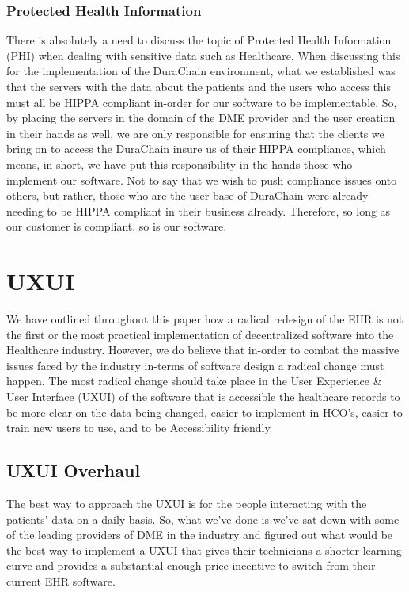 \documentclass[preprint,pre,floats,aps,amsmath,amssymb]{revtex4-1}
\begin{document}
\subsubsection{Protected Health Information}
There is absolutely a need to discuss the topic of Protected Health Information (PHI) when dealing with sensitive data such as Healthcare. When discussing this for the implementation of the DuraChain environment, what we established was that the servers with the data about the patients and the users who access this must all be HIPPA compliant in-order for our software to be implementable. So, by placing the servers in the domain of the DME provider and the user creation in their hands as well, we are only responsible for ensuring that the clients we bring on to access the DuraChain insure us of their HIPPA compliance, which means, in short, we have put this responsibility in the hands those who implement our software. Not to say that we wish to push compliance issues onto others, but rather, those who are the user base of DuraChain were already needing to be HIPPA compliant in their business already. Therefore, so long as our customer is compliant, so is our software.

\section{UXUI}
We have outlined throughout this paper how a radical redesign of the EHR is not the first or the most practical implementation of decentralized software into the Healthcare industry. However, we do believe that in-order to combat the massive issues faced by the industry in-terms of software design a radical change must happen. The most radical change should take place in the User Experience & User Interface (UXUI) of the software that is accessible the healthcare records to be more clear on the data being changed, easier to implement in HCO’s, easier to train new users to use, and to be Accessibility friendly.

\subsection{UXUI Overhaul}
The best way to approach the UXUI is for the people interacting with the patients' data on a daily basis. So, what we’ve done is we’ve sat down with some of the leading providers of DME in the industry and figured out what would be the best way to implement a UXUI that gives their technicians a shorter learning curve and provides a substantial enough price incentive to switch from their current EHR software.
\end{document}
